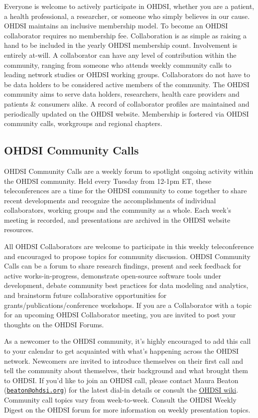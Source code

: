 \documentclass[11pt]{book}
\theoremstyle{definition}
\theoremstyle{definition}
\theoremstyle{definition}
\theoremstyle{remark}
\begin{document}
Everyone is welcome to actively participate in OHDSI, whether you are a patient, a health professional, a researcher, or someone who simply believes in our cause. OHDSI maintains an inclusive membership model. To become an OHDSI collaborator requires no membership fee. Collaboration is as simple as raising a hand to be included in the yearly OHDSI membership count. Involvement is entirely at-will. A collaborator can have any level of contribution within the community, ranging from someone who attends weekly community calls to leading network studies or OHDSI working groups. Collaborators do not have to be data holders to be considered active members of the community. The OHDSI community aims to serve data holders, researchers, health care providers and patients \& consumers alike. A record of collaborator profiles are maintained and periodically updated on the OHDSI website. Membership is fostered via OHDSI community calls, workgroups and regional chapters.  

\hypertarget{ohdsi-community-calls}{%
\subsection{OHDSI Community Calls}\label{ohdsi-community-calls}}

OHDSI Community Calls are a weekly forum to spotlight ongoing activity within the OHDSI community. Held every Tuesday from 12-1pm ET, these teleconferences are a time for the OHDSI community to come together to share recent developments and recognize the accomplishments of individual collaborators, working groups and the community as a whole. Each week's meeting is recorded, and presentations are archived in the OHDSI website resources.

All OHDSI Collaborators are welcome to participate in this weekly teleconference and encouraged to propose topics for community discussion. OHDSI Community Calls can be a forum to share research findings, present and seek feedback for active works-in-progress, demonstrate open-source software tools under development, debate community best practices for data modeling and analytics, and brainstorm future collaborative opportunities for grants/publications/conference workshops. If you are a Collaborator with a topic for an upcoming OHDSI Collaborator meeting, you are invited to post your thoughts on the OHDSI Forums.

As a newcomer to the OHDSI community, it's highly encouraged to add this call to your calendar to get acquainted with what's happening across the OHDSI network. Newcomers are invited to introduce themselves on their first call and tell the community about themselves, their background and what brought them to OHDSI. If you'd like to join an OHDSI call, please contact Maura Beaton (\href{mailto:beaton@ohdsi.org}{\nolinkurl{beaton@ohdsi.org}}) for the latest dial-in details or consult the \href{https://www.ohdsi.org/web/wiki/doku.php?id=projects:ohdsi_community}{OHDSI wiki}. Community call topics vary from week-to-week. Consult the OHDSI Weekly Digest on the OHDSI forum for more information on weekly presentation topics. 
\end{document}
